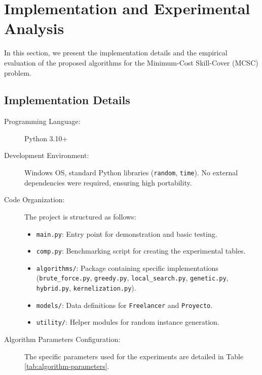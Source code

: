\section{Implementation and Experimental Analysis}
\label{sec:experimental-analysis}

In this section, we present the implementation details and the empirical evaluation of the proposed algorithms for the Minimum-Cost Skill-Cover (MCSC) problem.

\subsection{Implementation Details}
\label{subsec:implementation-details}

\begin{description}
\item[Programming Language:] Python 3.10+
\item[Development Environment:] Windows OS, standard Python libraries (\texttt{random}, \texttt{time}). No external dependencies were required, ensuring high portability.
\item[Code Organization:] The project is structured as follows:
    \begin{itemize}
        \item \texttt{main.py}: Entry point for demonstration and basic testing.
        \item \texttt{comp.py}: Benchmarking script for creating the experimental tables.
        \item \texttt{algorithms/}: Package containing specific implementations (\texttt{brute\_force.py}, \texttt{greedy.py}, \texttt{local\_search.py}, \texttt{genetic.py}, \texttt{hybrid.py}, \texttt{kernelization.py}).
        \item \texttt{models/}: Data definitions for \texttt{Freelancer} and \texttt{Proyecto}.
        \item \texttt{utility/}: Helper modules for random instance generation.
    \end{itemize}

\item[Algorithm Parameters Configuration:] The specific parameters used for the experiments are detailed in Table \ref{tab:algorithm-parameters}.


\end{description}

